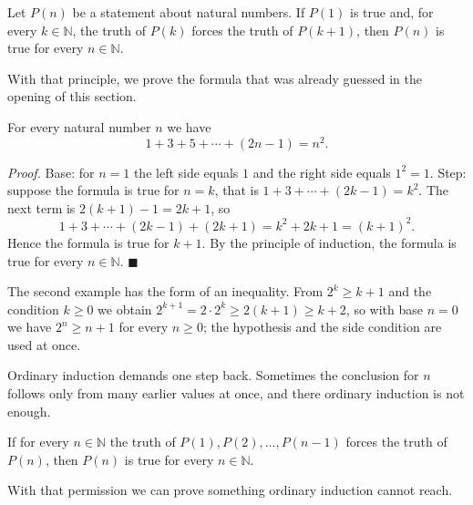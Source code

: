 \begin{catatan}
Let $P(n)$ be a statement about natural numbers. If $P(1)$ is true and, for every
$k \in \mathbb{N}$, the truth of $P(k)$ forces the truth of $P(k+1)$, then $P(n)$ is true
for every $n \in \mathbb{N}$.
\end{catatan}

With that principle, we prove the formula that was already guessed in the opening of this section.

\begin{teorema}
For every natural number $n$ we have
\[
  1 + 3 + 5 + \cdots + (2n-1) = n^{2}.
\]
\end{teorema}
\par\smallskip\noindent\textit{Proof.} Base: for $n = 1$ the left side equals $1$ and
the right side equals $1^{2} = 1$. Step: suppose the formula is true for $n = k$, that is
$1+3+\cdots+(2k-1) = k^{2}$. The next term is $2(k+1)-1 = 2k+1$, so
\[
  1+3+\cdots+(2k-1)+(2k+1) = k^{2} + 2k + 1 = (k+1)^{2}.
\]
Hence the formula is true for $k+1$. By the principle of induction, the formula is true for every
$n \in \mathbb{N}$.
\hfill$\blacksquare${\parfillskip=0pt\par}

The second example has the form of an inequality. From $2^{k} \geq k+1$ and the condition $k \geq 0$
we obtain $2^{k+1} = 2 \cdot 2^{k} \geq 2(k+1) \geq k+2$, so with base $n = 0$
we have $2^{n} \geq n+1$ for every $n \geq 0$; the hypothesis and the side condition are used
at once.

Ordinary induction demands one step back. Sometimes the conclusion for $n$ follows only from
many earlier values at once, and there ordinary induction is not enough.

\begin{catatan}
If for every $n \in \mathbb{N}$ the truth of $P(1), P(2), \dots, P(n-1)$ forces
the truth of $P(n)$, then $P(n)$ is true for every $n \in \mathbb{N}$.
\end{catatan}


With that permission we can prove something ordinary induction cannot reach.

